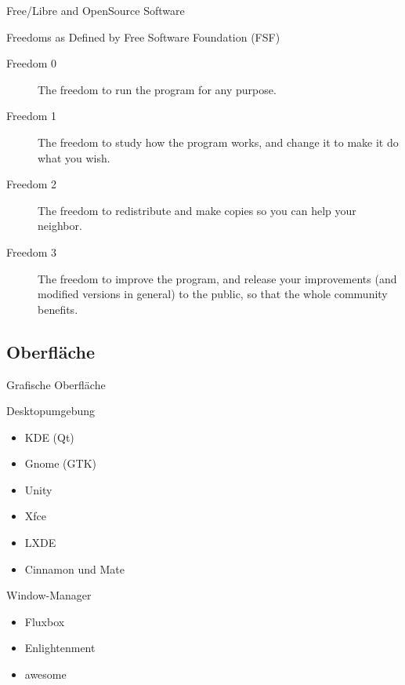 \documentclass{beamer}
\begin{document}
\frame{\tableofcontents[currentsection]}

\begin{frame}{Free/Libre and OpenSource Software}
    \begin{block}{Freedoms as Defined by Free Software Foundation (FSF)}
        \begin{description}
            \item[Freedom 0] The freedom to run the program for any
                purpose.
            \item[Freedom 1] The freedom to study how the program
                works, and change it to make it do what you wish.
            \item[Freedom 2] The freedom to redistribute and make
                copies so you can help your neighbor.
            \item[Freedom 3] The freedom to improve the program, and
                release your improvements (and modified versions in
                general) to the public, so that the whole community
                benefits.
        \end{description}
    \end{block}
\end{frame}

\subsection{Oberfläche}

\begin{frame}{Grafische Oberfläche}
    \begin{block}{Desktopumgebung}
        \begin{itemize}
            \item KDE (Qt)
            \item Gnome (GTK)
            \item Unity
            \item Xfce
            \item LXDE
            \item Cinnamon und Mate
        \end{itemize}
    \end{block}
    \pause
    \begin{block}{Window-Manager}
        \begin{itemize}
            \item Fluxbox
            \item Enlightenment
            \item awesome
        \end{itemize}
    \end{block}
\end{frame}
\end{document}
